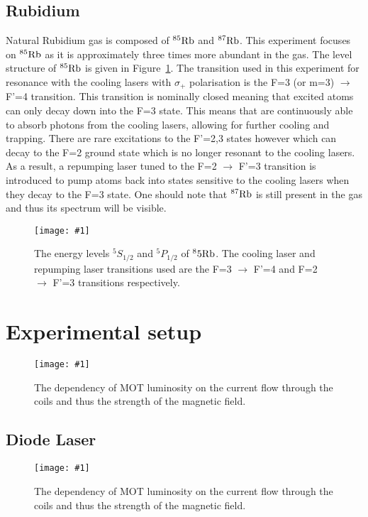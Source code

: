 \documentclass[twocolumn]{article}
\newcommand{\insertFigure}[1]{%
   \texttt{[image: \#1]}%
}
\begin{document}
\subsection{Rubidium} \label{sec:Rubidium}
Natural Rubidium gas is composed of $^{85}\ce{Rb}$ and $^{87}\ce{Rb}$. This experiment focuses on $^{85}\ce{Rb}$ as it is approximately three times more abundant in the gas. The level structure of $^{85}\ce{Rb}$ is given in Figure~\ref{fig:Spectrum}. The transition used in this experiment for resonance with the cooling lasers with $\sigma_+$ polarisation is the F=3 (or m=3) $\to$ F'=4 transition. This transition is nominally closed meaning that excited atoms can only decay down into the F=3 state. This means that are continuously able to absorb photons from the cooling lasers, allowing for further cooling and trapping. There are rare excitations to the F'=2,3 states however which can decay to the F=2 ground state which is no longer resonant to the cooling lasers. As a result, a repumping laser tuned to the F=2 $\to$ F'=3 transition is introduced to pump atoms back into states sensitive to the cooling lasers when they decay to the F=3 state. One should note that $^{87}\ce{Rb}$ is still present in the gas and thus its spectrum will be visible.
\begin{figure} [!h]
	\centering
	\insertFigure{Images/Spectrum.png}
	\caption{The energy levels $^5S_{1/2}$ and $^5P_{1/2}$ of $^85\ce{Rb}$. The cooling laser and repumping laser transitions used are the F=3 $\to$ F'=4 and F=2 $\to$ F'=3 transitions respectively.~\cite{Wieman}}
	\label{fig:Spectrum}
\end{figure}

\section{Experimental setup} \label{sec:Exp}
\begin{figure} [!h]
	\centering
	\insertFigure{Images/Laser.png}
	\caption{The dependency of MOT luminosity on the current flow through the coils and thus the strength of the magnetic field.}
	\label{fig:Laser}
\end{figure}
\subsection{Diode Laser}
\begin{figure} [!h]
	\centering
	\insertFigure{Images/Diode.png}
	\caption{The dependency of MOT luminosity on the current flow through the coils and thus the strength of the magnetic field.}
	\label{fig:Diode}
\end{figure}
\end{document}
